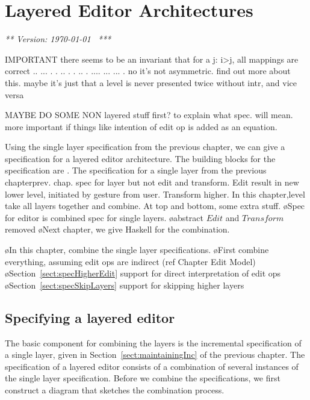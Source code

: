 \chapter{Layered Editor Architectures}
\label{chap:layeredArchs}
{\em *** Version: \today~ ***}


\bc

IMPORTANT there seems to be an invariant that for a j:  i>j, all mappings are correct 
  ..           ...       
 .  .    ..   .   .   .. 
.    ....  ...     ...  .
no it's not asymmetric. find out more about this.
maybe it's just that a level is never presented twice without intr, and vice versa


MAYBE DO SOME NON layered stuff first? to explain what spec. will mean. more important if things like intention of edit op is added as an equation.
\ec



\bc
Using the single layer specification from the previous chapter, we can give a specification for a layered editor architecture. The building blocks for the specification are . The specification for a single layer from the previous chapterprev. chap. spec for layer but not edit and transform. Edit result in new lower level, initiated by gesture from user. Transform higher. In this chapter,level take all layers together and combine. At top and bottom, some extra stuff.
\ec
\bl
\o Spec for editor is combined spec for single layers.
\o abstract $Edit$ and $Transform$ removed
\o Next chapter, we give Haskell for the combination.
\el


\bl
\o In this chapter, combine the single layer specifications.
\o First combine everything, assuming edit ops are indirect (ref Chapter Edit Model)
\o Section~\ref{sect:specHigherEdit} support for direct interpretation of edit ops
\o Section~\ref{sect:specSkipLayers} support for skipping higher layers
\el
\fromHere  %

\section{Specifying a layered editor}\label{sect:specCombination}

The basic component for combining the layers is the incremental specification of a single layer, given in Section~\ref{sect:maintainingInc} of the previous chapter. The specification of a layered editor consists of a combination of several instances of the single layer specification. Before we combine the specifications, we first construct a diagram that sketches the combination process.


